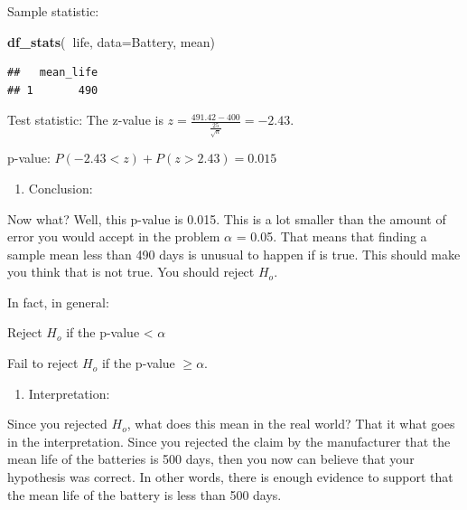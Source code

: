 \documentclass[
]{book}
\newenvironment{Shaded}{\begin{snugshade}}{\end{snugshade}}
\newcommand{\DataTypeTok}[1]{\textcolor[rgb]{0.13,0.29,0.53}{#1}}
\newcommand{\KeywordTok}[1]{\textcolor[rgb]{0.13,0.29,0.53}{\textbf{#1}}}
\newcommand{\NormalTok}[1]{#1}
\newcommand{\OperatorTok}[1]{\textcolor[rgb]{0.81,0.36,0.00}{\textbf{#1}}}
\providecommand{\tightlist}{%
  \setlength{\itemsep}{0pt}\setlength{\parskip}{0pt}}
\begin{document}
Sample statistic:

\begin{Shaded}
\begin{Highlighting}[]
\KeywordTok{df_stats}\NormalTok{(}\OperatorTok{~}\NormalTok{life, }\DataTypeTok{data=}\NormalTok{Battery, mean)}
\end{Highlighting}
\end{Shaded}

\begin{verbatim}
##   mean_life
## 1       490
\end{verbatim}

Test statistic:
The z-value is \(z=\frac{491.42-400}{\frac{25}{\sqrt{n}}}=-2.43\).

p-value:
\(P(-2.43<z)+P(z>2.43)=0.015\)

\begin{enumerate}
\def\labelenumi{\arabic{enumi}.}
\setcounter{enumi}{4}
\tightlist
\item
  Conclusion:
\end{enumerate}

Now what? Well, this p-value is 0.015. This is a lot smaller than the amount of error you would accept in the problem \(\alpha\) = 0.05. That means that finding a sample mean less than 490 days is unusual to happen if is true. This should make you think that is not true. You should reject \(H_o\).

In fact, in general:

Reject \(H_o\) if the p-value \textless{} \(\alpha\)

Fail to reject \(H_o\) if the p-value \(\ge\alpha\).

\begin{enumerate}
\def\labelenumi{\arabic{enumi}.}
\setcounter{enumi}{5}
\tightlist
\item
  Interpretation:
\end{enumerate}

Since you rejected \(H_o\), what does this mean in the real world? That it what goes in the interpretation. Since you rejected the claim by the manufacturer that the mean life of the batteries is 500 days, then you now can believe that your hypothesis was correct. In other words, there is enough evidence to support that the mean life of the battery is less than 500 days.
\end{document}

